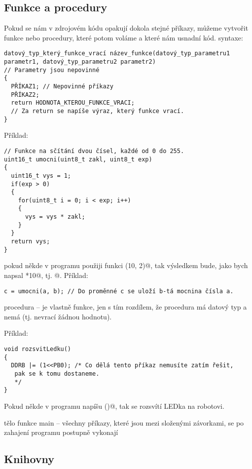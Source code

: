  
  
\subsection{Funkce a procedury} 

 Pokud se nám v zdrojovém kódu opakují dokola stejné příkazy, můžeme vytvořit funkce nebo procedury, které potom voláme a které nám usnadní kód.
syntaxe:
\begin{verbatim}
datový_typ_který_funkce_vrací název_funkce(datový_typ_parametru1 
parametr1, datový_typ_parametru2 parametr2) 
// Parametry jsou nepovinné
{
  PŘÍKAZ1; // Nepovinné příkazy
  PŘÍKAZ2;
  return HODNOTA_KTEROU_FUNKCE_VRACI; 
  // Za return se napíše výraz, který funkce vrací.
}
\end{verbatim}

Příklad:
\begin{verbatim}
// Funkce na sčítání dvou čísel, každé od 0 do 255.
uint16_t umocni(uint8_t zakl, uint8_t exp)
{
  uint16_t vys = 1;
  if(exp > 0)
  {
    for(uint8_t i = 0; i < exp; i++)
    {
      vys = vys * zakl; 
    }
  }
  return vys;
}
\end{verbatim}

pokud někde v programu použiji funkci \verb@secti(10, 2)@, tak výsledkem bude, jako bych napsal *10@, tj. @.
Příklad:
\begin{verbatim}
c = umocni(a, b); // Do proměnné c se uloží b-tá mocnina čísla a. 
\end{verbatim}

procedura -- je vlastně funkce, jen s tím rozdílem, že procedura má datový typ \verb@void@ %
a nemá \verb@return@ (tj. nevrací žádnou hodnotu).

Příklad:
\begin{verbatim}
void rozsvitLedku()
{
  DDRB |= (1<<PB0); /* Co dělá tento příkaz nemusíte zatím řešit,
   pak se k tomu dostaneme.
   */
}
\end{verbatim}

Pokud někde v programu napíšu \verb@rozsvitLedku()@, tak se rozsvítí LEDka na robotovi.

tělo funkce main -- všechny příkazy, které jsou mezi složenými závorkami, se po zahajení programu postupně vykonají

\label{knihovna}\subsection{Knihovny}

